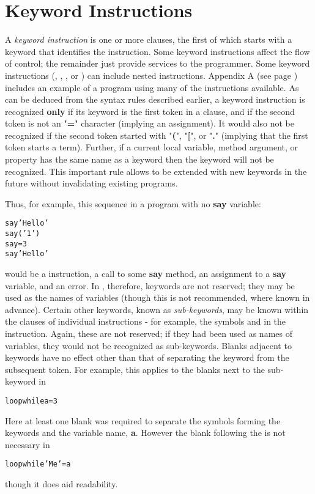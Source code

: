 \chapter{Keyword Instructions}\label{refkinst}
 A \emph{keyword instruction} is one or more clauses, the first of
which starts with a keyword that identifies the instruction.
Some keyword instructions affect the flow of control; the remainder
just provide services to the programmer.
Some keyword instructions (, , , or
) can include nested instructions.
 Appendix A (see page \pageref{refappa})  includes an example of a \nr{} program
using many of the instructions available.
 As can be deduced from the syntax rules described earlier, a keyword
instruction is recognized \textbf{only} if its keyword is the first
token in a clause, and if the second token is not an "\textbf{=}"
character (implying an assignment).
It would also not be recognized if the second token started
with "\textbf{(}", "\textbf{[}",
or "\textbf{.}" (implying that the first token starts a term).
 Further, if a current local variable, method argument, or property
has the same name as a keyword then the keyword will not be recognized.
This important rule allows \nr{} to be extended with new keywords in
the future without invalidating existing programs.
 
Thus, for example, this sequence in a program with no \textbf{say}
variable:
\begin{alltt}
say 'Hello'
say('1')
say=3
say 'Hello'
\end{alltt}
would be a  instruction, a call to some \textbf{say}
method, an assignment to a \textbf{say} variable, and an error.
 In \nr{}, therefore, keywords are not reserved; they may be used as
the names of variables (though this is not recommended, where known in
advance).
 Certain other keywords, known as \emph{sub-keywords}, may be
known within the clauses of individual instructions - for
example, the symbols  and  in the 
instruction.  Again, these are not reserved; if they had been used as
names of variables, they would not be recognized as sub-keywords.
 Blanks adjacent to keywords have no effect other than that of
separating the keyword from the subsequent token.
For example, this applies to the blanks next to the sub-keyword
 in
\begin{alltt}
loop  while  a=3
\end{alltt}
Here at least one blank was required to separate the symbols
forming the keywords and the variable name, \textbf{a}.  However the
blank following the  is not necessary in
\begin{alltt}
loop while 'Me'=a
\end{alltt}
though it does aid readability.
